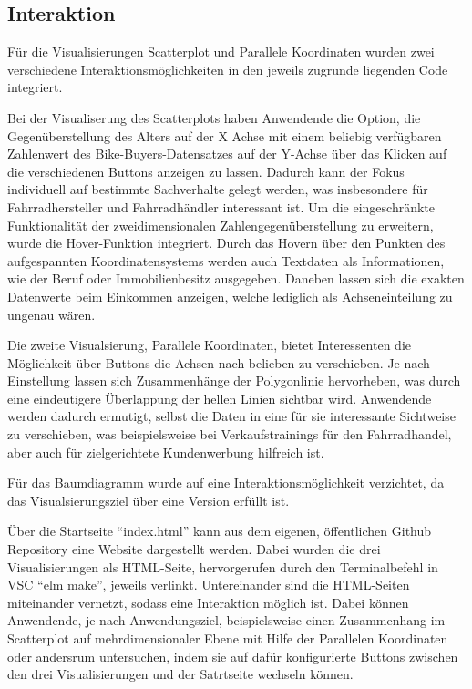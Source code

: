 \documentclass[usegeometry=true]{scrartcl}
\begin{document}
\subsection{Interaktion}
Für die Visualisierungen Scatterplot und Parallele Koordinaten wurden zwei verschiedene Interaktionsmöglichkeiten in den jeweils zugrunde liegenden Code integriert. 

Bei der Visualiserung des Scatterplots haben Anwendende die Option, die Gegenüberstellung des Alters auf der X Achse mit einem beliebig verfügbaren Zahlenwert des Bike-Buyers-Datensatzes auf der Y-Achse  über das Klicken auf die verschiedenen Buttons anzeigen zu lassen. Dadurch kann der Fokus individuell auf bestimmte Sachverhalte gelegt werden, was insbesondere für Fahrradhersteller und Fahrradhändler interessant ist. Um die eingeschränkte Funktionalität der zweidimensionalen Zahlengegenüberstellung zu erweitern, wurde die Hover-Funktion integriert. Durch das Hovern über den Punkten des aufgespannten Koordinatensystems werden auch Textdaten als Informationen, wie der Beruf oder Immobilienbesitz ausgegeben. Daneben lassen sich die exakten Datenwerte beim Einkommen anzeigen, welche lediglich als Achseneinteilung zu ungenau wären. 

Die zweite Visualsierung, Parallele Koordinaten, bietet Interessenten die Möglichkeit über Buttons die Achsen nach belieben zu verschieben. Je nach Einstellung lassen sich Zusammenhänge der Polygonlinie hervorheben, was durch eine eindeutigere Überlappung der hellen Linien sichtbar wird. Anwendende werden dadurch ermutigt, selbst die Daten in eine für sie interessante Sichtweise zu verschieben, was beispielsweise bei Verkaufstrainings für den Fahrradhandel, aber auch für zielgerichtete Kundenwerbung hilfreich ist. 

Für das Baumdiagramm wurde auf eine Interaktionsmöglichkeit verzichtet, da das Visualsierungsziel über eine Version erfüllt ist. 

Über die Startseite "`index.html"' kann aus dem eigenen, öffentlichen Github Repository eine Website dargestellt werden. Dabei wurden die drei Visualisierungen als HTML-Seite, hervorgerufen durch  den Terminalbefehl in VSC "`elm make"', jeweils verlinkt. Untereinander sind die HTML-Seiten miteinander vernetzt, sodass eine Interaktion möglich ist. Dabei können Anwendende, je nach Anwendungsziel, beispielsweise einen Zusammenhang im Scatterplot auf mehrdimensionaler Ebene mit Hilfe der Parallelen Koordinaten oder andersrum untersuchen, indem sie auf dafür konfigurierte Buttons zwischen den drei Visualisierungen und der Satrtseite wechseln können.
\end{document}
